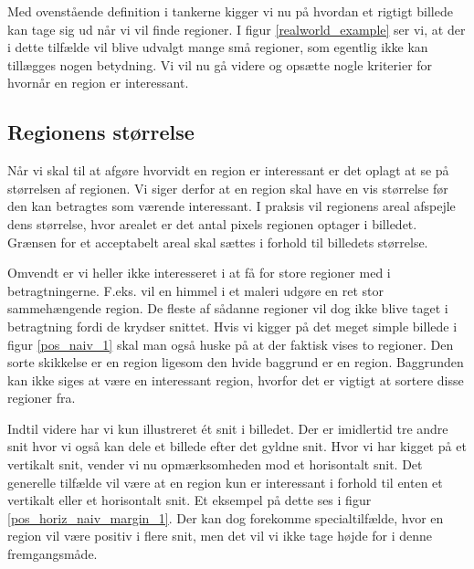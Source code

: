 {Med ovenstående definition i tankerne kigger vi nu på hvordan et rigtigt
billede kan tage sig ud når vi vil finde regioner. I figur
\ref{realworld_example} ser vi, at der i dette tilfælde vil blive
udvalgt mange små regioner, som egentlig ikke kan tillægges nogen
betydning.  Vi vil nu gå videre og opsætte nogle kriterier for hvornår
en region er interessant.

\subsection{Regionens størrelse}
Når vi skal til at afgøre hvorvidt en region er interessant er det
oplagt at se på størrelsen af regionen.  Vi siger derfor at en region
skal have en vis størrelse før den kan betragtes som værende
interessant. I praksis vil regionens areal afspejle dens størrelse, hvor
arealet er det antal pixels regionen optager i billedet.  Grænsen for et
acceptabelt areal skal sættes i forhold til billedets størrelse.

Omvendt er vi heller ikke interesseret i at få for store regioner med i
betragtningerne.  F.eks. vil en himmel i et maleri udgøre en ret stor
sammehængende region.  De fleste af sådanne regioner vil dog ikke blive
taget i betragtning fordi de krydser snittet.  Hvis vi kigger på det
meget simple billede i figur \ref{pos_naiv_1} skal man også huske på at
der faktisk vises to regioner. Den sorte skikkelse er en region ligesom
den hvide baggrund er en region.  Baggrunden kan ikke siges at være en
interessant region, hvorfor det er vigtigt at sortere disse regioner
fra.

Indtil videre har vi kun illustreret ét snit i billedet.  Der er
imidlertid tre andre snit hvor vi også kan dele et billede efter det
gyldne snit.  Hvor vi har kigget på et vertikalt snit, vender vi nu
opmærksomheden mod et horisontalt snit.  Det generelle tilfælde vil være
at en region kun er interessant i forhold til enten et vertikalt eller
et horisontalt snit.  Et eksempel på dette ses i figur
\ref{pos_horiz_naiv_margin_1}.  Der kan dog forekomme specialtilfælde,
hvor en region vil være positiv i flere snit, men det vil vi ikke tage
højde for i denne fremgangsmåde.

}
